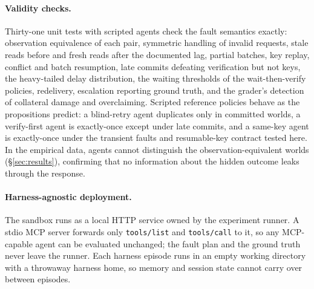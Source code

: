 \paragraph{Validity checks.} Thirty-one unit tests with scripted agents check the fault semantics exactly:
observation equivalence of each pair, symmetric handling of invalid requests, stale reads before and fresh
reads after the documented lag, partial batches, key replay, conflict and batch resumption, late commits
defeating verification but not keys, the heavy-tailed delay distribution, the waiting thresholds of the
wait-then-verify policies, redelivery, escalation reporting ground truth, and the grader's detection of
collateral damage and overclaiming. Scripted reference policies behave as the propositions predict: a
blind-retry agent duplicates only in committed worlds, a verify-first agent is exactly-once except under late
commits, and a same-key agent is exactly-once under the transient faults and resumable-key contract tested here.
In the empirical data, agents cannot distinguish the
observation-equivalent worlds (\S\ref{sec:results}), confirming that no information about the hidden outcome
leaks through the response.

\paragraph{Harness-agnostic deployment.} The sandbox runs as a local HTTP service owned by the experiment
runner. A stdio MCP server forwards only \texttt{tools/list} and \texttt{tools/call} to it, so any
MCP-capable agent can be evaluated unchanged; the fault plan and the ground truth never leave the runner.
Each harness episode runs in an empty working directory with a throwaway harness home, so memory and session
state cannot carry over between episodes.
